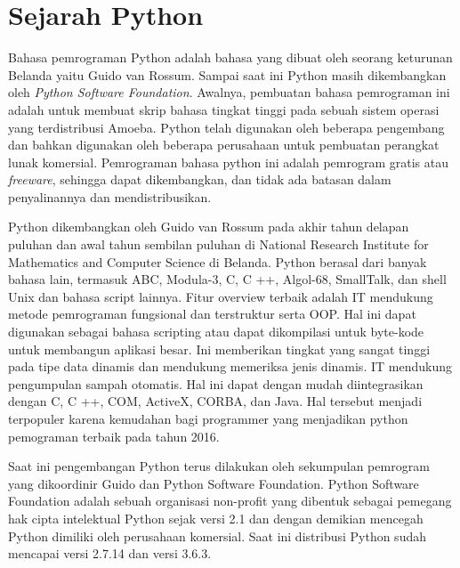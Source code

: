 \section{Sejarah Python}
Bahasa pemrograman Python adalah bahasa yang dibuat oleh seorang keturunan Belanda yaitu Guido van Rossum. Sampai saat ini Python masih dikembangkan oleh \textit{Python Software Foundation}. Awalnya, pembuatan bahasa pemrograman ini adalah untuk membuat skrip bahasa tingkat tinggi pada sebuah sistem operasi yang terdistribusi Amoeba. Python telah digunakan oleh beberapa pengembang dan bahkan digunakan oleh beberapa perusahaan untuk pembuatan perangkat lunak komersial. Pemrograman bahasa python ini adalah pemrogram gratis atau \textit{freeware}, sehingga dapat dikembangkan, dan tidak ada batasan dalam penyalinannya dan mendistribusikan. 

Python dikembangkan oleh Guido van Rossum pada akhir tahun delapan puluhan dan awal tahun sembilan puluhan di National Research Institute for Mathematics and Computer Science di Belanda. Python berasal dari banyak bahasa lain, termasuk ABC, Modula-3, C, C ++, Algol-68, SmallTalk, dan shell Unix dan bahasa script lainnya.
Fitur overview terbaik adalah IT mendukung metode pemrograman fungsional dan terstruktur serta OOP. Hal ini dapat digunakan sebagai bahasa scripting atau dapat dikompilasi untuk byte-kode untuk membangun aplikasi besar. Ini memberikan tingkat yang sangat tinggi pada tipe data dinamis dan mendukung memeriksa jenis dinamis. IT mendukung pengumpulan sampah otomatis. Hal ini dapat dengan mudah diintegrasikan dengan C, C ++, COM, ActiveX, CORBA, dan Java. Hal tersebut menjadi terpopuler karena kemudahan bagi programmer yang menjadikan python pemograman terbaik pada tahun 2016.

Saat ini pengembangan Python terus dilakukan oleh sekumpulan pemrogram yang dikoordinir Guido dan Python Software Foundation. Python Software Foundation adalah sebuah organisasi non-profit yang dibentuk sebagai pemegang hak cipta intelektual Python sejak versi 2.1 dan dengan demikian mencegah Python dimiliki oleh perusahaan komersial. Saat ini distribusi Python sudah mencapai versi 2.7.14 dan versi 3.6.3. 